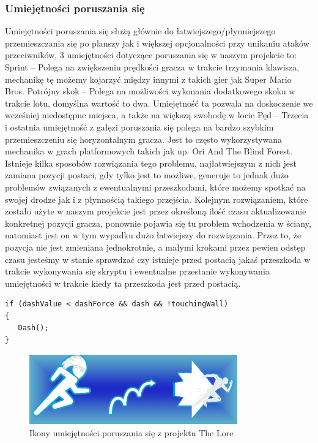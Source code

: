 \documentclass[oneside,polski,logo]{amuthesis}
\begin{document}
\subsubsection{Umiejętności poruszania się}
Umiejętności poruszania się służą głównie do łatwiejszego/płynniejszego przemieszczania się po planszy jak i większej opcjonalności przy unikaniu ataków przeciwników, 3 umiejętności dotyczące poruszania się w naszym projekcie to:
Sprint – Polega na zwiększeniu prędkości gracza w trakcie trzymania klawisza, mechanikę tę możemy kojarzyć między innymi z takich gier jak Super Mario Bros.
Potrójny skok – Polega na możliwości wykonania dodatkowego skoku w trakcie lotu, domyślna wartość to dwa. Umiejętność ta pozwala na doskoczenie we wcześniej niedostępne miejsca, a także na większą swobodę w locie
Pęd – Trzecia i ostatnia umiejętność z gałęzi poruszania się polega na bardzo szybkim przemieszczeniu się horyzontalnym gracza. Jest to często wykorzystywana mechanika w grach platformowych takich jak np. Ori And The Blind Forest. Istnieje kilka sposobów rozwiązania tego problemu, najłatwiejszym z nich jest zamiana pozycji postaci, gdy tylko jest to możliwe, generuje to jednak dużo problemów związanych z ewentualnymi przeszkodami, które możemy spotkać na swojej drodze jak i z płynnością takiego przejścia. Kolejnym rozwiązaniem, które zostało użyte w naszym projekcie jest przez określoną ilość czasu aktualizowanie konkretnej pozycji gracza, ponownie pojawia się tu problem wchodzenia w ściany, natomiast jest on w tym wypadku dużo łatwiejszy do rozwiązania. Przez to, że pozycja nie jest zmieniana jednokrotnie, a małymi krokami przez pewien odstęp czasu jesteśmy w stanie sprawdzać czy istnieje przed postacią jakaś przeszkoda w trakcie wykonywania się skryptu i ewentualne przestanie wykonywania umiejętności w trakcie kiedy ta przeszkoda jest przed postacią.

\begin{lstlisting}[breaklines=true,
language={[Sharp]C},
rulecolor=\color{blue!80!black},
caption={Fragment klasy \texttt{PlayerSkills.cs}}
]    
if (dashValue < dashForce && dash && !touchingWall)
{
   Dash();
}
\end{lstlisting}
\begin{figure}[h]
	\centering
	\includegraphics[width=9cm]{images/kozubal/movement.png}
	\caption{Ikony umiejętności poruszania się z projektu The Lore}
\end{figure}
\end{document}
